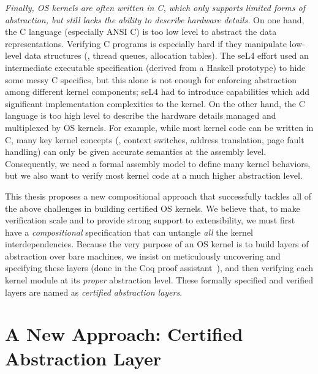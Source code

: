 {\em Finally, OS kernels are often written in C, which only supports
  limited forms of abstraction,
  but still lacks the ability to describe hardware details.}
On one hand, the C language (especially ANSI C) is
  too low level to abstract the data representations.
Verifying C programs is
especially hard if they manipulate low-level data structures (\eg,
thread queues, allocation tables). The seL4 effort used an
intermediate executable specification (derived from a Haskell
prototype) to hide some messy C specifics, but this alone is not
enough for enforcing abstraction among different kernel components;
seL4 had to introduce capabilities which add significant
implementation complexities to the kernel.
On the other hand, the C language is
too high level to describe the hardware details
managed and multiplexed by OS kernels.
For example, while most kernel code
can be written in C, many key kernel concepts (\eg, context switches,
address translation, page fault handling) can only be given accurate
semantics at the assembly level. Consequently, we need a formal
assembly model to define many kernel behaviors, but we also want to
verify most kernel code at a much higher abstraction level.



This thesis proposes a new compositional approach that
successfully tackles all of the above challenges in building certified
OS kernels. We believe that, to make verification scale and to provide
strong support to extensibility, we must first have a {\em
  compositional} specification that can untangle {\em all} the kernel
interdependencies. Because the very purpose of an OS kernel is to
build layers of abstraction over bare machines, we insist on
meticulously uncovering and specifying these layers (done in the Coq
proof assistant~\cite{coq}), and then verifying each kernel module at
its {\em proper} abstraction level.
These formally specified and verified layers
are named as {\em certified abstraction layers}.

\section{A New Approach: Certified Abstraction Layer}
\label{sec:intro:layer}

